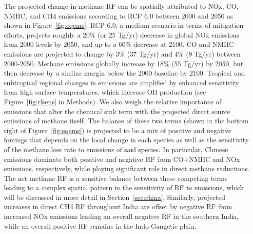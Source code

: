 The projected change in methane RF can be spatially attributed to NOx, CO, NMHC, and CH4 emissions according to RCP 6.0 between 2000 and 2050 as shown in Figure~\ref{fig:eqems}. RCP 6.0, a medium scenario in terms of mitigation efforts, projects roughly a 20\% (or 25 Tg/yr) decrease in global NOx emissions from 2000 levels by 2050, and up to a 60\% decrease at 2100. CO and NMHC emissions are projected to change by 3\% (37 Tg/yr) and 4\% (9 Tg/yr) between 2000-2050. Methane emissions globally increase by 18\% (55 Tg/yr) by 2050, but then decrease by a similar margin below the 2000 baseline by 2100. Tropical and subtropical regional changes in emissions are amplified by enhanced sensitivity from high surface temperatures, which increase OH production (see Figure~\ref{fig:rfsens} in Methods). We also weigh the relative importance of emissions that alter the chemical sink term with the projected direct source emissions of methane itself. The balance of these two terms (shown in the bottom right of Figure~\ref{fig:eqems}) is projected to be a mix of positive and negative forcings that depends on the local change in each species as well as the sensitivity of the methane loss rate to emissions of said species. In particular, Chinese emissions dominate both positive and negative RF from CO+NMHC and NOx emissions, respectively, while playing significant role in direct methane reductions.  The net methane RF is a sensitive balance between these competing terms leading to a complex spatial pattern in the sensitivity of RF to emissions, which will be discussed in more detail in Section~\ref{sec:china}.  Similarly, projected increases in direct CH4 RF throughout India are offset by negative RF from increased NOx emissions leading an overall negative RF in the southern India, while an overall positive RF remains in the Indo-Gangetic plain.  


